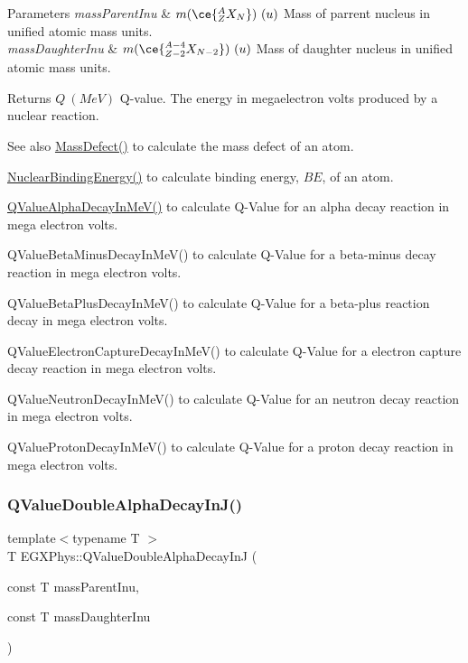 \begin{DoxyParams}{Parameters}
{\em mass\+Parent\+Inu} & $m(\ce{ ^{A}_{Z}X_{N} })\ (u)$ Mass of parrent nucleus in unified atomic mass units. \\
\hline
{\em mass\+Daughter\+Inu} & $m(\ce{ ^{A-4}_{Z-2}X_{N-2} })\ (u)$ Mass of daughter nucleus in unified atomic mass units. \\
\hline
\end{DoxyParams}
\begin{DoxyReturn}{Returns}
$Q\ (MeV)$ Q-\/value. The energy in megaelectron volts produced by a nuclear reaction. 
\end{DoxyReturn}
\begin{DoxySeeAlso}{See also}
\mbox{\hyperlink{group___e_g_x_phys-_mass_defect_gae89f2dfa65992c0314adc2440b2f582a}{Mass\+Defect()}} to calculate the mass defect of an atom. 

\mbox{\hyperlink{group___e_g_x_phys-_nuclear_binding_energy_gab6832bf15ead7b4e867e759e0a2a078e}{Nuclear\+Binding\+Energy()}} to calculate binding energy, $BE$, of an atom. 

\mbox{\hyperlink{_q_value_8hpp_a4f9a38d3ad4bf93471a0affb493b6e72}{Q\+Value\+Alpha\+Decay\+In\+Me\+V()}} to calculate Q-\/\+Value for an alpha decay reaction in mega electron volts. 

Q\+Value\+Beta\+Minus\+Decay\+In\+Me\+V() to calculate Q-\/\+Value for a beta-\/minus decay reaction in mega electron volts. 

Q\+Value\+Beta\+Plus\+Decay\+In\+Me\+V() to calculate Q-\/\+Value for a beta-\/plus reaction decay in mega electron volts. 

Q\+Value\+Electron\+Capture\+Decay\+In\+Me\+V() to calculate Q-\/\+Value for a electron capture decay reaction in mega electron volts. 

Q\+Value\+Neutron\+Decay\+In\+Me\+V() to calculate Q-\/\+Value for an neutron decay reaction in mega electron volts. 

Q\+Value\+Proton\+Decay\+In\+Me\+V() to calculate Q-\/\+Value for a proton decay reaction in mega electron volts. 
\end{DoxySeeAlso}
\mbox{\label{_q_value_8hpp_file_a015ade04346d0c6dae4dda8e3aab8cbd}} 
\subsubsection{\texorpdfstring{Q\+Value\+Double\+Alpha\+Decay\+In\+J()}{QValueDoubleAlphaDecayInJ()}}
{\footnotesize\ttfamily template$<$typename T $>$ \\
T E\+G\+X\+Phys\+::\+Q\+Value\+Double\+Alpha\+Decay\+InJ (\begin{DoxyParamCaption}\item[{const T}]{mass\+Parent\+Inu,  }\item[{const T}]{mass\+Daughter\+Inu }\end{DoxyParamCaption})}



